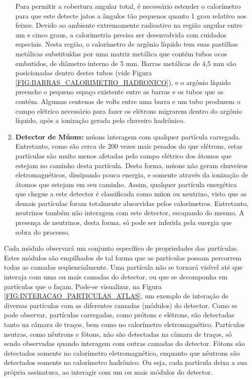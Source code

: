 \begin{enumerate}
Para permitir a cobertura angular total, é necessário estender o calorímetro para que este detecte jatos a ângulos tão pequenos quanto 1 grau relativo aos feixes. Devido ao ambiente extremamente radioativo na região angular entre um e cinco graus, a calorimetria precisa ser desenvolvida com cuidados especiais. Nesta região, o calorímetro de argônio líquido tem suas pastilhas metálicas substituídas por uma matriz metálica que contém tubos ocos embutidos, de diâmetro interno de 5 mm. Barras metálicas de 4,5 mm são posicionadas dentro destes tubos (vide Figura \ref{FIG:BARRAS_CALORIMETRO_HADRONICO}), e o argônio líquido preenche o pequeno espaço existente entre as barras e os tubos que as contém. Algumas centenas de volts entre uma barra e um tubo produzem o campo elétrico necessário para fazer os elétrons migrarem dentro do argônio líquido, após a ionização gerada pelo chuveiro hadrônico.


\item \textbf{Detector de Múons:} múons interagem com qualquer partícula carregada. Entretanto, como são cerca de 200 vezes mais pesados do que elétrons, estas partículas são muito menos afetadas pelo campo elétrico dos átomos que estejam no caminho desta partícula. Desta forma, múons não geram chuveiros eletromagnéticos, dissipando pouca energia, e somente através da ionização de átomos que estejam em seu caminho. Assim, qualquer partícula energética que chegue a este detector é classificada como múon ou neutrino, visto que as demais partículas foram totalmente absorvidas pelos calorímetros. Entretanto, neutrinos também não interagem com este detector, escapando do mesmo. A presença de neutrinos, desta forma, só pode ser inferida pela energia que sobra do processo.

\end{enumerate}

Cada módulo observará um conjunto específico de propriedades das partículas. Estes módulos são empilhados de tal forma que as partículas possam percorrem todas as camadas seqüencialmente. Uma partícula não se tornará visível até que interaja com uma ou mais camadas do detector, ou que se decomponha em partículas que o façam. Pode-se visualizar, na Figura \ref{FIG:INTERACAO_PARTICULAS_ATLAS}, um exemplo de interação de diversas partículas com as diferentes camadas (módulos) do detector. Como se pode observar, partículas carregadas, como prótons e elétrons, são detectadas tanto na câmara de traços, bem como no calorímetro eletromagnético. Partículas neutras, como nêutrons e fótons, não são detectadas na câmara de traços, só sendo observadas quando interagem com outras camadas do detector. Fótons são detectados somente no calorímetro eletromagnético, enquanto que nêutrons são detectados somente no calorímetro hadrônico. Ou seja, cada partícula deixa a sua própria assinatura, ao interagir com um ou mais módulos do detector. 


